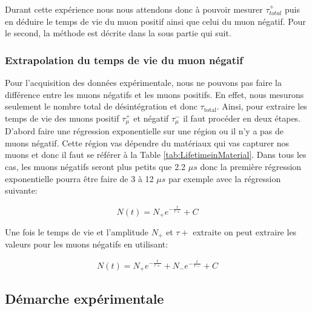 \documentclass[12pt]{article}
\begin{document}
Durant cette expérience nous nous attendons donc à pouvoir mesurer $\tau_{total}^{+}$  puis en déduire le temps de vie du muon positif ainsi que celui du muon négatif. Pour le second, la méthode est décrite dans la sous partie qui suit.  


\subsubsection{Extrapolation du temps de vie du muon négatif}

Pour l'acquisition des données expérimentale, nous ne pouvons pas faire la différence entre les muons négatifs et les muons positifs. En effet, nous mesurons seulement le nombre total de désintégration et donc $\tau_{\text{total}}$. Ainsi, pour extraire les temps de vie des muons positif $\tau^{+}_{\mu}$ et négatif $\tau^{-}_{\mu}$ il faut procéder en deux étapes. D'abord faire une régression exponentielle sur une région ou il n'y a pas de muons négatif. Cette région vas dépendre du matériaux qui vas capturer nos muons et donc il faut se référer à la Table \ref{tab:LifetimeinMaterial}. Dans tous les cas, les muons négatifs seront plus petits que 2.2 $\mu s$ donc la première régression exponentielle pourra être faire de 3 à 12 $\mu s$ par exemple avec la régression suivante:

\[ N(t) = N_{+}e^{-\frac{t}{\tau+}}+C \]

Une fois le temps de vie et l'amplitude $N_{+}$ et $\tau+$ extraite on peut extraire les valeurs pour les muons négatifs en utilisant:

\[ N(t) = N_{+}e^{-\frac{t}{\tau+}}+N_{-}e^{-\frac{t}{\tau-}}+C \]

\subsection{Démarche expérimentale}
\end{document}
